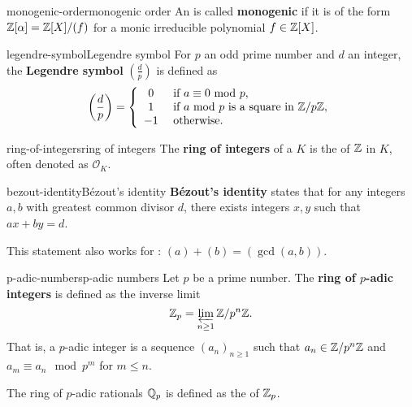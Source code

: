 \begin{topic}{monogenic-order}{monogenic order}
    An  is called \textbf{monogenic} if it is of the form $\mathbb{Z}[\alpha] = \mathbb{Z}[X] / (f)$ for a monic irreducible polynomial $f \in \mathbb{Z}[X]$.
\end{topic}

\begin{topic}{legendre-symbol}{Legendre symbol}
    For $p$ an odd prime number and $d$ an integer, the \textbf{Legendre symbol} $\left(\tfrac{d}{p}\right)$ is defined as
    \[ \left(\frac{d}{p}\right) = \left\{ \begin{array}{cl}
        0 & \text{ if $a \equiv 0 \text{ mod } p$} , \\
        1 & \text{ if $a \text{ mod } p$ is a square in $\mathbb{Z}/p\mathbb{Z}$} ,  \\
        -1 & \text{ otherwise} .
    \end{array} \right. \]
\end{topic}

\begin{topic}{ring-of-integers}{ring of integers}
    The \textbf{ring of integers} of a  $K$ is the  of $\mathbb{Z}$ in $K$, often denoted as $\mathcal{O}_K$. %
\end{topic}

\begin{topic}{bezout-identity}{Bézout's identity}
    \textbf{Bézout's identity} states that for any integers $a, b$ with greatest common divisor $d$, there exists integers $x, y$ such that $ax + by = d$.
    
    This statement also works for : $(a) + (b) = (\gcd(a, b))$.
\end{topic}

\begin{topic}{p-adic-numbers}{p-adic numbers}
    Let $p$ be a prime number. The \textbf{ring of $p$-adic integers} is defined as the inverse limit
    \[ \mathbb{Z}_p = \varprojlim_{n \ge 1} \mathbb{Z} / p^n \mathbb{Z} . \]
    That is, a $p$-adic integer is a sequence $(a_n)_{n \ge 1}$ such that $a_n \in \mathbb{Z} / p^n \mathbb{Z}$ and $a_m \equiv a_n \mod p^m$ for $m \le n$.
    
    The ring of $p$-adic rationals $\mathbb{Q}_p$ is defined as the  of $\mathbb{Z}_p$.
\end{topic}

